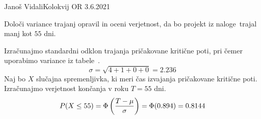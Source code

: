 \begin{naloga}{Janoš Vidali}{Kolokvij OR 3.6.2021}
\begin{vprasanje}
Določi variance trajanj opravil in oceni ve\-rjet\-nost,
da bo projekt iz naloge~\nal[dirka] trajal manj kot $55$ dni.
\end{vprasanje}

\begin{odgovor}
Izračunajmo standardni odklon trajanja pričakovane kritične poti,
pri čemer uporabimo variance iz tabele~.
$$
\sigma = \sqrt{4 + 1 + 0 + 0} = 2.236
$$
Naj bo $X$ slučajna spremenljivka,
ki meri čas izvajanja pričakovane kritične poti.
Izračunajmo verjetnost končanja v roku $T = 55$ dni.
$$
P(X \le 55) = \Phi\left({T - \mu \over \sigma}\right) = \Phi(0.894) = 0.8144
$$
\end{odgovor}
\end{naloga}
